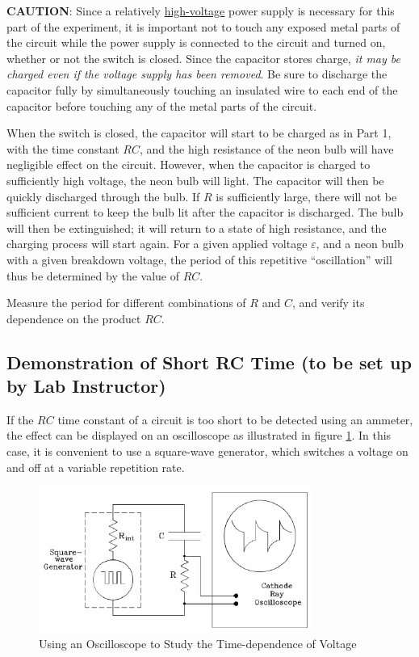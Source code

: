 \textbf{CAUTION}: Since a relatively \underline{high-voltage} power supply is necessary for this part of the experiment, it is important not to touch any exposed metal parts of the circuit while the power supply is connected to the circuit and turned on, whether or not the switch is closed. Since the capacitor stores charge, \emph{it may be charged even if the voltage supply has been removed}. Be sure to discharge the capacitor fully by simultaneously touching an insulated wire to each end of the capacitor before touching any of the metal parts of the circuit.\myskip

When the switch is closed, the capacitor will start to be charged as in Part 1, with the time constant $RC$, and the high resistance of the neon bulb will have negligible effect on the circuit. However, when the capacitor is charged to sufficiently high voltage, the neon bulb will light. The capacitor will then be quickly discharged through the bulb. If $R$ is sufficiently large, there will not be sufficient current to keep the bulb lit after the capacitor is discharged. The bulb will then be extinguished; it will return to a state of high resistance, and the charging process will start again. For a given applied voltage $\varepsilon$, and a neon bulb with a given breakdown voltage, the period of this repetitive ``oscillation'' will thus be determined by the value of $RC$.\myskip

Measure the period for different combinations of $R$ and $C$, and verify its dependence on the product $RC$.

\subsection{Demonstration of Short RC Time (to be set up by Lab Instructor)}

If the $RC$ time constant of a circuit is too short to be detected using an ammeter, the effect can be displayed on an oscilloscope as illustrated in figure \ref{fig:capaoscil}. In this case, it is convenient to use a square-wave generator, which switches a voltage on and off at a variable repetition rate.\myskip

\begin{figure}[h]
    \begin{center}
        \includegraphics[width=0.8\textwidth]{./Exp3/pic/image9.png}
    \end{center}
    \caption{Using an Oscilloscope to Study the Time-dependence of Voltage}
    \label{fig:capaoscil}
\end{figure}

